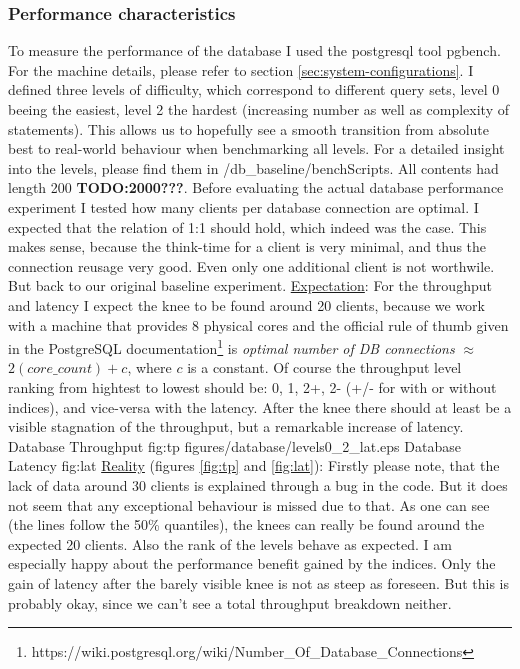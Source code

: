 \documentclass[11pt]{article}
\begin{document}
\subsubsection{Performance characteristics}\label{sec:performance-characteristics}
To measure the performance of the database I used the postgresql tool pgbench. For the machine details, please refer to section \ref{sec:system-configurations}. I defined three levels of difficulty, which correspond to different query sets, level 0 beeing the easiest, level 2 the hardest (increasing number as well as complexity of statements). This allows us to hopefully see a smooth transition from absolute best to real-world behaviour when benchmarking all levels. For a detailed insight into the levels, please find them in /db\_baseline/benchScripts. All contents had length 200 \textbf{TODO:2000???}. Before evaluating the actual database performance experiment I tested how many clients per database connection are optimal. I expected that the relation of 1:1 should hold, which indeed was the case. This makes sense, because the think-time for a client is very minimal, and thus the connection reusage very good. Even only one additional client is not worthwile. But back to our original baseline experiment.
\newline\underline{Expectation}: For the throughput and latency I expect the knee to be found around 20 clients, because we work with a machine that provides 8 physical cores and the official rule of thumb given in the PostgreSQL documentation\footnote[1]{https://wiki.postgresql.org/wiki/Number\_Of\_Database\_Connections} is \textit{optimal number of DB connections} $\approx$ $2(core\_count)+c$, where $c$ is a constant. Of course the throughput level ranking from hightest to lowest should be: 0, 1, 2+, 2- (+/- for with or without indices), and vice-versa with the latency. After the knee there should at least be a visible stagnation of the throughput, but a remarkable increase of latency.
 {Database Throughput} {fig:tp}
		{figures/database/levels0_2_lat.eps} {Database Latency} {fig:lat}
\newline\underline{Reality} (figures \ref{fig:tp} and \ref{fig:lat}): Firstly please note, that the lack of data around 30 clients is explained through a bug in the code. But it does not seem that any exceptional behaviour is missed due to that. As one can see (the lines follow the 50\% quantiles), the knees can really be found around the expected 20 clients. Also the rank of the levels behave as expected. I am especially happy about the performance benefit gained by the indices. Only the gain of latency after the barely visible knee is not as steep as foreseen. But this is probably okay, since we can't see a total throughput breakdown neither.
\end{document}
